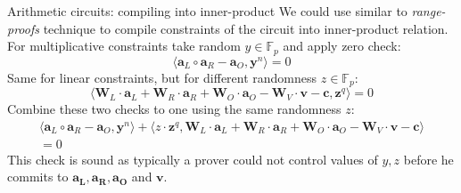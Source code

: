 \documentclass{zkdl-presentation-template}
\begin{document}
    \begin{frame}{Arithmetic circuits: compiling into inner-product}
        We could use similar to \textit{range-proofs} technique to compile constraints of the circuit into inner-product relation. For multiplicative constraints take random $y \in \mathbb{F}_p$ and apply zero check:
        $$ \langle \mathbf{a}_L \circ \mathbf{a}_R - \mathbf{a}_O, \mathbf{y}^n \rangle = 0$$
        \pause
        Same for linear constraints, but for different randomness $z \in \mathbb{F}_p$:
        $$ \langle \mathbf{W}_L \cdot \mathbf{a}_L + \mathbf{W}_R \cdot \mathbf{a}_R + \mathbf{W}_O \cdot \mathbf{a}_O - \mathbf{W}_V \cdot \mathbf{v} - \mathbf{c}, \mathbf{z}^q \rangle = 0$$
        \pause
        Combine these two checks to one using the same randomness $z$:
        \begin{equation*}
            \begin{aligned}
                \langle \mathbf{a}_L \circ \mathbf{a}_R - \mathbf{a}_O, \mathbf{y}^n \rangle + \langle z \cdot \mathbf{z}^q,  \mathbf{W}_L \cdot \mathbf{a}_L + \mathbf{W}_R \cdot \mathbf{a}_R + \mathbf{W}_O \cdot \mathbf{a}_O - \mathbf{W}_V \cdot \mathbf{v} - \mathbf{c} \rangle \\= 0
            \end{aligned}
        \end{equation*}
        This check is sound as typically a prover could not control values of $y,z$ before he commits to $\mathbf{a_L, a_R, a_O}$ and $\mathbf{v}$.
    \end{frame}
\end{document}
